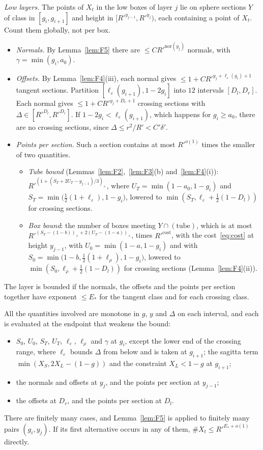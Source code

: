 \documentclass[aps,prx,twocolumn,superscriptaddress,nofootinbib,longbibliography]{revtex4-2}
\theoremstyle{plain}
\theoremstyle{definition}
\theoremstyle{remark}
\begin{document}
\emph{Low layers.} The points of $X_t$ in the low boxes of layer $j$ lie on sphere sections $Y$ of class in $[g_i,g_{i+1}]$ and height in $[R'^{y_{j-1}},R'^{y_j})$, each containing a point of $X_t$. Count them globally, not per box.
\begin{itemize}\setlength\itemsep{0pt}
\item \emph{Normals.} By Lemma~\ref{lem:F5} there are $\le CR'^{\mathrm{nor}(y_j)}$ normals, with $\gamma=\min(g_i,a_0)$.
\item \emph{Offsets.} By Lemma~\ref{lem:F4}(iii), each normal gives $\le1+CR'^{y_j+\ell_\varepsilon(g_i)+1}$ tangent sections. Partition $[\ell_\varepsilon(g_{i+1}),1-2g_i]$ into $12$ intervals $[D_l,D_r]$. Each normal gives $\le1+CR'^{y_j+D_r+1}$ crossing sections with $\Delta\in[R'^{D_l},R'^{D_r}]$. If $1-2g_i<\ell_\varepsilon(g_{i+1})$, which happens for $g_i\ge a_0$, there are no crossing sections, since $\Delta\le r^2/R'<C'\delta'$.
\item \emph{Points per section.} Such a section contains at most $R'^{o(1)}$ times the smaller of two quantities.
\begin{itemize}\setlength\itemsep{0pt}
\item \emph{Tube bound} (Lemmas~\ref{lem:F2},~\ref{lem:F3}(b) and~\ref{lem:F4}(i)): $R'^{(1+(S_T+2U_T-y_{j-1})/3)_+}$, where $U_T=\min(1-a_0,1-g_i)$ and $S_T=\min\big(\tfrac12(1+\ell_\varepsilon),1-g_i\big)$, lowered to $\min(S_T,\ell_\varepsilon+\tfrac12(1-D_l))$ for crossing sections.
\item \emph{Box bound}: the number of boxes meeting $Y\cap(\text{tube})$, which is at most $R'^{(S_T-(1-b))_++2(U_T-(1-a))_+}$, times $R'^{\mathrm{cost}}$, with the cost~\eqref{eq:cost} at height $y_{j-1}$, with $U_0=\min(1-a,1-g_i)$ and with $S_0=\min\big(1-b,\tfrac12(1+\ell_\rho),1-g_i\big)$, lowered to $\min(S_0,\ell_\rho+\tfrac12(1-D_l))$ for crossing sections (Lemma~\ref{lem:F4}(ii)).
\end{itemize}
\end{itemize}
The layer is bounded if the normals, the offsets and the points per section together have exponent $\le E_*$ for the tangent class and for each crossing class.

All the quantities involved are monotone in $g$, $y$ and $\Delta$ on each interval, and each is evaluated at the endpoint that weakens the bound:
\begin{itemize}\setlength\itemsep{0pt}
\item $S_0$, $U_0$, $S_T$, $U_T$, $\ell_\varepsilon$, $\ell_\rho$ and $\gamma$ at $g_i$, except the lower end of the crossing range, where $\ell_\varepsilon$ bounds $\Delta$ from below and is taken at $g_{i+1}$; the sagitta term $\min(X_S,2X_L-(1-g))$ and the constraint $X_L<1-g$ at $g_{i+1}$;
\item the normals and offsets at $y_j$, and the points per section at $y_{j-1}$;
\item the offsets at $D_r$, and the points per section at $D_l$.
\end{itemize}
There are finitely many cases, and Lemma~\ref{lem:F5} is applied to finitely many pairs $(g_i,y_j)$. If its first alternative occurs in any of them, $\#X_t\le R'^{E_*+o(1)}$ directly.
\end{document}
